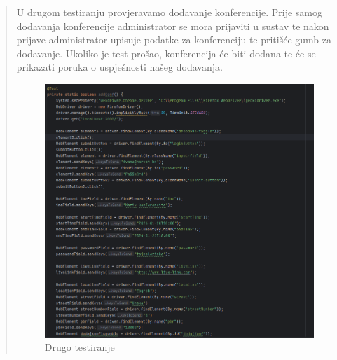 \begin{packed_enum}
				\begin{quote}
					U drugom testiranju provjeravamo dodavanje konferencije. Prije samog dodavanja konferencije administrator se mora prijaviti u sustav te nakon prijave administrator upisuje podatke za konferenciju te pritišće gumb za dodavanje. Ukoliko je test prošao, konferencija će biti dodana te će se prikazati poruka o uspješnosti našeg dodavanja.
					\begin{figure}[H]
						\includegraphics[width=\textwidth]{slike/Selenium2.png} %
						\caption{Drugo testiranje}
						\label{fig:Selenium2} %
					\end{figure}
				\end{quote}
				

\end{packed_enum}
